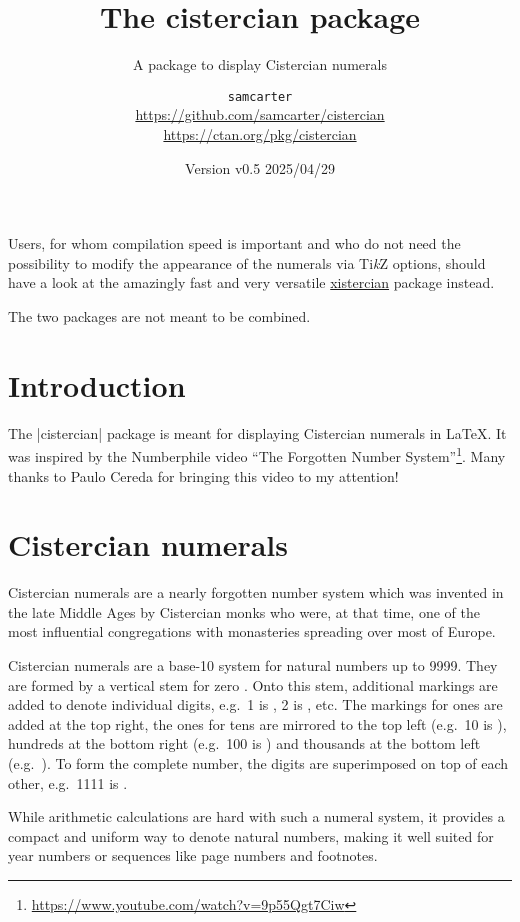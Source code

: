 \documentclass{scrartcl}
\title{The cistercian package}
\subtitle{A package to display Cistercian numerals}
\author{%
  \texorpdfstring{
    \texttt{samcarter}\\
    \url{https://github.com/samcarter/cistercian}\\
    \url{https://ctan.org/pkg/cistercian}
  }{samcarter}}
\date{Version v0.5 \textendash{} 2025/04/29}
\begin{document}
\maketitle
\thispagestyle{scrheadings}

\begin{tcolorbox}[width=.8\textwidth,center,sidebyside=false,title={Note}]
Users, for whom compilation speed is important and who do not need the possibility to modify the appearance of the numerals via Ti\emph{k}Z options, should have a look at the amazingly fast and very versatile \href{https://ctan.org/pkg/xistercian}{xistercian} package instead.

The two packages are not meant to be combined.
\end{tcolorbox}

\section{Introduction}

The \saminline|cistercian| package is meant for displaying Cistercian numerals in \LaTeX{}.
It was inspired by the Numberphile video ``The Forgotten Number System''\footnote{\url{https://www.youtube.com/watch?v=9p55Qgt7Ciw}}. Many thanks to Paulo Cereda for bringing this video to my attention!

\blurb

\section{Cistercian numerals}

Cistercian numerals are a nearly forgotten number system which was invented in the late Middle Ages by Cistercian monks who were, at that time, one of the most influential congregations with monasteries spreading over most of Europe.

Cistercian numerals are a base-10 system for natural numbers up to 9999.
They are formed by a vertical stem for zero .
Onto this stem, additional markings are added to denote individual digits, e.g.\ 1 is , 2 is , etc.
The markings for ones are added at the top right, the ones for tens are mirrored to the top left (e.g.\ 10 is ), hundreds at the bottom right (e.g.\ 100 is ) and thousands at the bottom left (e.g.\ ).
To form the complete number, the digits are superimposed on top of each other, e.g.\ 1111 is .

While arithmetic calculations are hard with such a numeral system, it provides a compact and uniform way to denote natural numbers, making it well suited for year numbers or sequences like page numbers and footnotes. 
\end{document}
